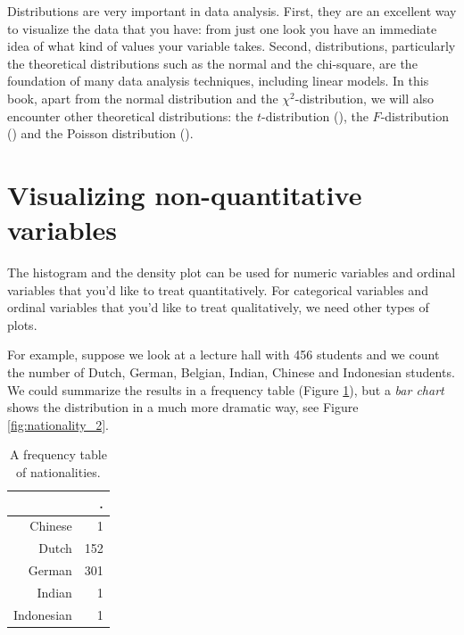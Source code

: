 \documentclass[]{report}\usepackage[]{graphicx}\usepackage[]{color}
\begin{document}
Distributions are very important in data analysis. First, they are an excellent way to visualize the data that you have: from just one look you have an immediate idea of what kind of values your variable takes. Second, distributions, particularly the theoretical distributions such as the normal and the chi-square, are the foundation of many data analysis techniques, including linear models. In this book, apart from the normal distribution and the $\chi^2$-distribution, we will also encounter other theoretical distributions: the $t$-distribution (), the $F$-distribution () and the Poisson distribution ().  



\section{Visualizing non-quantitative variables}

The histogram and the density plot can be used for numeric variables and ordinal variables that you'd like to treat quantitatively. For categorical variables and ordinal variables that you'd like to treat qualitatively, we need other types of plots. 

For example, suppose we look at a lecture hall with 456 students and we count the number of Dutch, German, Belgian, Indian, Chinese and Indonesian students. We could summarize the results in a frequency table (Figure \ref{tab:nationality_1}), but a \textit{bar chart} shows the distribution in a much more dramatic way, see Figure \ref{fig:nationality_2}. 



\begin{table}[ht]
\centering
\caption{A frequency table of nationalities.} 
\label{tab:nationality_1}
\begin{tabular}{rr}
  \hline
 & . \\ 
  \hline
Chinese & 1 \\ 
  Dutch & 152 \\ 
  German & 301 \\ 
  Indian & 1 \\ 
  Indonesian & 1 \\ 
   \hline
\end{tabular}
\end{table}
\end{document}
